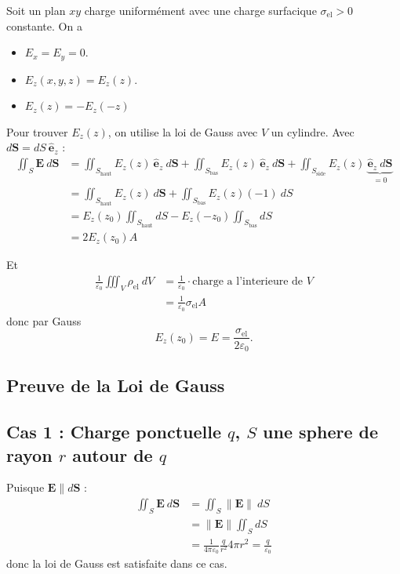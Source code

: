 
\begin{example}
Soit un plan $xy$ charge uniformément avec une charge surfacique $\sigma _{\mathrm{el}}>0$ constante. On a
\begin{itemize}
\item $E_{x}=E_{y}=0$.
\item $E_{z}(x,y,z)=E_{z}(z)$.
\item $E_{z}(z)=-E_{z}(-z)$
\end{itemize}

Pour trouver $E_{z}(z)$, on utilise la loi de Gauss avec $V$ un cylindre. Avec $d\boldsymbol{S}=dS~\boldsymbol{\hat{e}}_{z}$ :
\begin{align*}
\iint _{S}\boldsymbol{E}~d\boldsymbol{S} & =\iint _{S_{\mathrm{haut}}}E_{z}(z)~\boldsymbol{\hat{e} }_{z}~d\boldsymbol{S}+\iint _{S_{\mathrm{bas}}}E_{z}(z)~\boldsymbol{\hat{e}}_{z}~d\boldsymbol{S}+\iint _{S_{\mathrm{side}}}E_{z}(z)~\underbrace{ \boldsymbol{\hat{e}}_{z}~d\boldsymbol{S} }_{ =0 } \\
 & =\iint _{S_{\mathrm{haut}}}E_{z}(z)~d\boldsymbol{S}+\iint _{S_{\mathrm{bas}}}E_{z}(z)(-1)~dS \\
 &=E_{z}(z_{0})\iint _{S_{\mathrm{haut}}}dS-E_{z}(-z_{0})\iint _{S_{\mathrm{bas}}}dS \\
 & =2E_{z}(z_{0})A
\end{align*}

Et 
\begin{align*}
\frac{1}{\varepsilon_{0}}\iiint _{V}\rho _{\mathrm{el}}~dV & =\frac{1}{\varepsilon_{0}}\cdot\text{charge a l'interieure de }V \\
 & =\frac{1}{\varepsilon_{0}}\sigma _{\mathrm{el}}A
\end{align*}
donc par Gauss
$$
E_{z}(z_{0})=E=\frac{\sigma _{\mathrm{el}}}{2\varepsilon_{0}}.
$$
\end{example}
\subsection{Preuve de la Loi de Gauss}
\subsection*{Cas 1 : Charge ponctuelle $q$, $S$ une sphere de rayon $r$ autour de $q$}
Puisque $\boldsymbol{E}\parallel d\boldsymbol{S}$ :
\begin{align*}
\iint _{S}\boldsymbol{E}~d\boldsymbol{S} & =\iint _{S}\lVert \boldsymbol{E} \rVert ~dS \\
 &=\lVert \boldsymbol{E} \rVert \iint _{S}dS \\
 & =\frac{1}{4\pi\varepsilon_{0}} \frac{q}{r^{2}} 4\pi r^{2}=\frac{q}{\varepsilon_{0}}
\end{align*}
donc la loi de Gauss est satisfaite dans ce cas.

